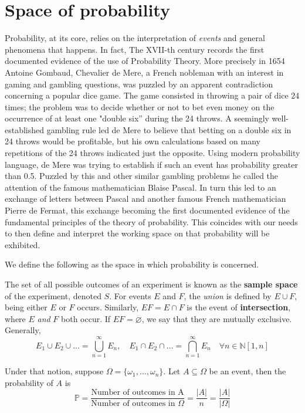 \section{Space of probability}

Probability, at its core, relies on the interpretation of \textit{events} and general phenomena that happens. In fact, The XVII-th century records the first documented evidence of the use of Probability Theory. More precisely in 1654 Antoine Gombaud, Chevalier de Mere, a French nobleman with an interest in gaming and gambling questions, was puzzled by an apparent contradiction concerning a popular dice game. The game consisted in throwing a pair of dice 24 times; the problem was to decide whether or not to bet even money on the occurrence of at least one "double six” during the 24 throws. A seemingly well-established gambling rule led de Mere to believe that betting on a double six in 24 throws would be profitable, but his own calculations based on many repetitions of the 24 throws indicated just the opposite. Using modern probability language, de Mere was trying to establish if such an event has probability greater than 0.5. Puzzled by this and other similar gambling problems he called the attention of the famous mathematician Blaise Pascal. In turn this led to an exchange of letters between Pascal and another famous French mathematician Pierre de Fermat, this exchange becoming the first documented evidence of the fundamental principles of the theory of probability. This coincides with our needs to then define and interpret the working space on that probability will be exhibited. 

We define the following as the space in which probability is concerned.
\begin{definition}
    The set of all possible outcomes of an experiment is known as the \textbf{sample space} of the experiment, denoted $S$. For events $E$ and $F$, the \textit{union} is defined by $E\cup F$, being either $E$ or $F$ occurs. Similarly, $EF=E\cap F$ is the event of \textbf{intersection}, where $E$ \textit{and} $F$ both occur. If $EF=\varnothing$, we say that they are mutually exclusive. Generally, \begin{equation}
        E_{1}\cup E_{2}\cup\dots=\bigcup_{n=1}^{\infty}E_{n}, \quad E_{1}\cap E_{2}\cap\dots=\bigcap^{\infty}_{n=1}E_{n} \quad \forall n \in \mathbb{N}[1,n]
    \end{equation}
\end{definition}
Under that notion, suppose $\Omega=\{ \omega_{1},\dots,\omega_{n}\}$. Let $A\subseteq \Omega$ be an event, then the probability of $A$ is 
$$\mathbb{P}=\frac{\text{Number of outcomes in A}}{\text{Number of outcomes in }\Omega}=\frac{\lvert A \rvert}{n}=\frac{\lvert A \rvert }{\lvert \Omega \rvert }$$

